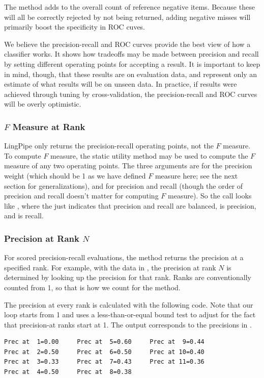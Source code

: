The method  adds to the overall count of
reference negative items.  Because these will all be correctly
rejected by not being returned, adding negative misses will primarily
boost the specificity in ROC cuves.  

We believe the precision-recall and ROC curves provide the best view
of how a classifier works.  It shows how tradeoffs may be made between
precision and recall by setting different operating points for
accepting a result.  It is important to keep in mind, though, that
these results are on evaluation data, and represent only an estimate
of what results will be on unseen data.  In practice, if results were
achieved through tuning by cross-validation, the precision-recall and
ROC curves will be overly optimistic.


\subsubsection{$F$ Measure at Rank}

LingPipe only returns the precision-recall operating points, not the
$F$ measure.  To compute $F$ measure, the static utility method
 may be used to compute the $F$
measure of any two operating points.  The three arguments are for the
precision weight (which should be 1 as we have defined $F$ measure
here; see the next section for generalizations), and for precision and
recall (though the order of precision and recall doesn't matter for
computing $F$ measure). So the call looks like
, where the  just indicates that
precision and recall are balanced,  is precision, and 
is recall.

\subsubsection{Precision at Rank $N$}

For scored precision-recall evaluations, the method
 returns the precision at a specified rank.
For example, with the data in , the
precision at rank $N$ is determined by looking up the precision for
that rank.  Ranks are conventionally counted from 1, so that is how we
count for the  method.

The precision at every rank is calculated with the following code.
%
%
Note that our loop starts from 1 and uses a less-than-or-equal bound
test to adjust for the fact that precision-at ranks start at 1.  The
output corresponds to the precisions in .
%
\begin{verbatim}
Prec at  1=0.00     Prec at  5=0.60     Prec at  9=0.44
Prec at  2=0.50     Prec at  6=0.50     Prec at 10=0.40
Prec at  3=0.33     Prec at  7=0.43     Prec at 11=0.36
Prec at  4=0.50     Prec at  8=0.38
\end{verbatim}
%

